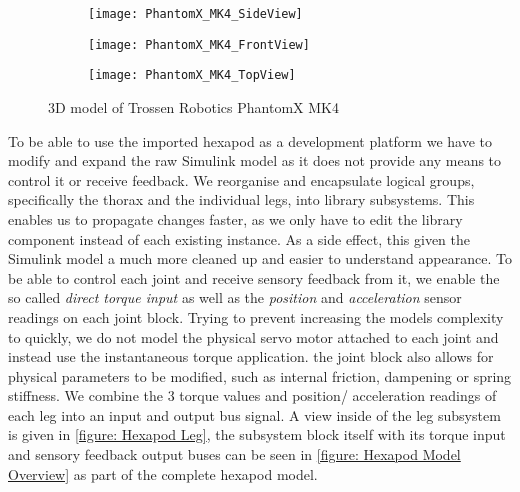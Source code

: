 \begin{figure}[h]
	\begin{subfigure}{.5\textwidth} %
		\centering
		\texttt{[image: PhantomX\_MK4\_SideView]}  %
		\caption{}
		\label{figure: PhantomX Side View}
	\end{subfigure}
	\begin{subfigure}{.5\textwidth}
		\centering
		\texttt{[image: PhantomX\_MK4\_FrontView]}  
		\caption{}
		\label{figure: PhantomX Front View}
	\end{subfigure}
	
	\label{fig:fig}
	\begin{subfigure}{\textwidth}
		\centering
		\texttt{[image: PhantomX\_MK4\_TopView]}   %
		\caption{}
		\label{figure: PhantomX Top View}
	\end{subfigure}
	\caption[]{3D model of Trossen Robotics PhantomX MK4}
	\label{figure: PhantomX 3D model}
\end{figure}

To be able to use the imported hexapod as a development platform we have to modify and expand the raw Simulink model as it does not provide any means to control it or receive feedback.
We reorganise and encapsulate logical groups, specifically the thorax and the individual legs, into library subsystems.
This enables us to propagate changes faster, as we only have to edit the library component instead of each existing instance.
As a side effect, this given the Simulink model a much more cleaned up and easier to understand appearance.
To be able to control each joint and receive sensory feedback from it, we enable the so called \textit{direct torque input} as well as the \textit{position} and \textit{acceleration} sensor readings on each joint block.
Trying to prevent increasing the models complexity to quickly, we do not model the physical servo motor attached to each joint and instead use the instantaneous torque application.
the joint block also allows for physical parameters to be modified, such as internal friction, dampening or spring stiffness.
We combine the 3 torque values and position/ acceleration readings of each leg into an input and output bus signal.
A view inside of the leg subsystem is given in \ref{figure: Hexapod Leg}, the subsystem block itself with its torque input and sensory feedback output buses can be seen in \ref{figure: Hexapod Model Overview} as part of the complete hexapod model.


